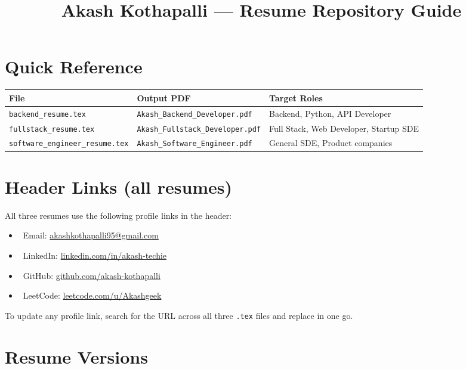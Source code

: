 \documentclass[a4paper,11pt]{article}
\title{\textbf{Akash Kothapalli --- Resume Repository Guide}}
\date{}
\author{}
\newcommand{\iconbadge}[1]{%
  \tikz[baseline=-0.55ex]{\node[circle,fill=myblue,text=white,font=\bfseries\fontsize{5}{5}\selectfont,inner sep=1.3pt,minimum size=10pt]{#1};}%
}
\begin{document}
\maketitle

\section*{Quick Reference}

\begin{tabular}{lll}
\textbf{File} & \textbf{Output PDF} & \textbf{Target Roles} \\
\hline
\texttt{backend\_resume.tex} & \texttt{Akash\_Backend\_Developer.pdf} & Backend, Python, API Developer \\
\texttt{fullstack\_resume.tex} & \texttt{Akash\_Fullstack\_Developer.pdf} & Full Stack, Web Developer, Startup SDE \\
\texttt{software\_engineer\_resume.tex} & \texttt{Akash\_Software\_Engineer.pdf} & General SDE, Product companies \\
\end{tabular}

\section*{Header Links (all resumes)}

All three resumes use the following profile links in the header:

\begin{itemize}
\item \iconbadge{@}~Email: \href{mailto:akashkothapalli95@gmail.com}{akashkothapalli95@gmail.com}
\item \iconbadge{in}~LinkedIn: \href{https://www.linkedin.com/in/akash-techie}{linkedin.com/in/akash-techie}
\item \iconbadge{gh}~GitHub: \href{https://github.com/akash-kothapalli}{github.com/akash-kothapalli}
\item \iconbadge{lc}~LeetCode: \href{https://leetcode.com/u/Akashgeek}{leetcode.com/u/Akashgeek}
\end{itemize}

To update any profile link, search for the URL across all three \texttt{.tex} files and replace in one go.

\section*{Resume Versions}
\end{document}
